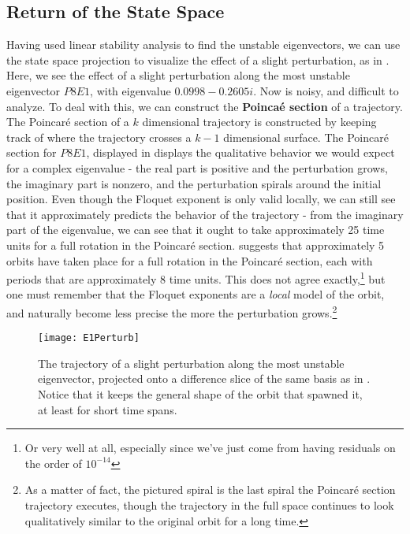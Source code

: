 \subsection{Return of the State Space}

Having used linear stability analysis to find the unstable eigenvectors, we can use the state space projection to visualize the effect of a slight perturbation, as  in . Here, we see the effect of a slight perturbation along the most unstable eigenvector $P8E1$, with eigenvalue $0.0998 - 0.2605 i$. Now  is noisy, and difficult to analyze. To deal with this, we can construct the {\bf Poinca\'e section} of a trajectory. The Poincar\'e section of a $k$ dimensional trajectory is constructed by keeping track of where the trajectory crosses a $k-1$ dimensional surface. The Poincar\'e section for  $P8E1$, displayed in  displays the qualitative behavior we would expect for a complex eigenvalue - the real part is positive and the perturbation grows, the imaginary part is nonzero, and the perturbation spirals around the initial position. Even though the Floquet exponent is only valid locally, we can still see that it approximately predicts the behavior of the trajectory - from the imaginary part of the eigenvalue, we can see that it ought to take approximately 25 time units for a full rotation in the Poincar\'e section.  suggests that approximately 5 orbits have taken place for a full rotation in the Poincar\'e section, each with periods that are approximately 8 time units. This does not agree exactly,\footnote{Or very well at all, especially since we've just come from having residuals on the order of $10^{-14}$} but one must remember that the Floquet exponents are a \emph{local} model of the orbit, and naturally become less precise the more the perturbation grows.\footnote{As a matter of fact, the pictured spiral is the last spiral the Poincar\'e section trajectory executes, though the trajectory in the full space continues to look qualitatively similar to the original orbit for a long time.}   


\begin{figure}[h!]
\centerline{\texttt{[image: E1Perturb]}}
\caption{The trajectory of a slight perturbation along the most unstable eigenvector, projected onto a difference slice of the same basis as in . Notice that it keeps the general shape of the orbit that spawned it, at least for short time spans.}\label{fig:p8E1}
\end{figure}

